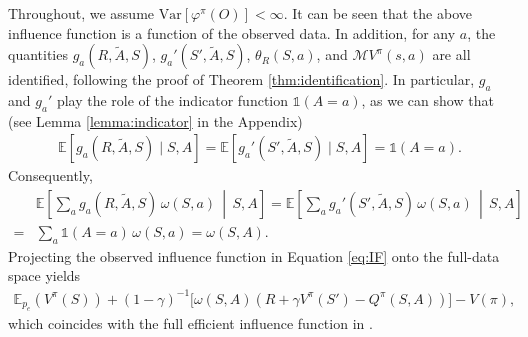 \documentclass[12pt]{article}
\newcommand{\Var}{{\mbox{Var}}}
\newcommand{\0}{\boldsymbol{0}}
\newtheorem{remark}{Remark}
\newcommand{\E}{\mathbb{E}}
\begin{document}


Throughout, we assume  $\Var\!\left[\varphi^\pi(O)\right]<\infty$. It can be seen that the above influence function is a function of the observed data. In addition, for any $a$, the quantities $g_a(R,\widetilde A,S)$, $g_a'(S',\widetilde A,S)$, $\theta_R(S,a)$, and $\mathcal{M}V^\pi(s,a)$ are all identified, following the proof of Theorem \ref{thm:identification}.
In particular, $g_a$ and $g_a'$ play the role of the indicator function $\mathds{1}(A=a)$, as we can show that (see Lemma \ref{lemma:indicator} in the Appendix)
\begin{gather*}
    \E\!\left[g_a(R,\widetilde A,S)\mid S,A\right]=\E\!\left[g_a'(S',\widetilde A,S)\mid S,A\right]=\mathds{1}(A=a).
\end{gather*}
Consequently,
\begin{align*}
    &\E\!\left[\sum_a g_a(R,\widetilde A,S)\,\omega(S,a)\,\middle|\,S,A\right]
    =\E\!\left[\sum_a g_a'(S',\widetilde A,S)\,\omega(S,a)\,\middle|\,S,A\right]\\
    = & \sum_a \mathds{1}(A=a)\,\omega(S,a)
    =\omega(S,A).
\end{align*}
Projecting the observed influence function in Equation \eqref{eq:IF} onto the full-data space yields 
\begin{align*}
\E_{p_e} (V^\pi(S))+(1-\gamma)^{-1} \Big[\omega(S,A)\left( R+ \gamma V^\pi(S')-Q^\pi(S,A)\right) \Big]-V(\pi),
\end{align*} which coincides with the full efficient influence function in \citet{kallus2022efficiently}. 
\end{document}
